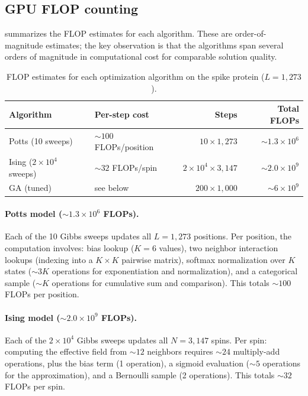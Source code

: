 \documentclass[11pt]{article}
\begin{document}
\subsection*{GPU FLOP counting}

 summarizes the FLOP estimates for each algorithm.
These are order-of-magnitude estimates; the key observation is that the algorithms span several orders of magnitude in computational cost for comparable solution quality.

\begin{table}[H]
\centering
\caption{FLOP estimates for each optimization algorithm on the spike protein ($L = 1{,}273$).}
\label{tab:flops}
\vspace{2mm}
\begin{tabular}{llrr}
\toprule
Algorithm & Per-step cost & Steps & Total FLOPs \\
\midrule
Potts (10 sweeps) & ${\sim}100$ FLOPs/position & $10 \times 1{,}273$ & ${\sim}1.3 \times 10^6$ \\
Ising ($2 \times 10^4$ sweeps) & ${\sim}32$ FLOPs/spin & $2 \times 10^4 \times 3{,}147$ & ${\sim}2.0 \times 10^9$ \\
GA (tuned) & see below & $200 \times 1{,}000$ & ${\sim}6 \times 10^9$ \\
\bottomrule
\end{tabular}
\end{table}

\paragraph{Potts model (${\sim}1.3 \times 10^6$ FLOPs).}
Each of the 10 Gibbs sweeps updates all $L = 1{,}273$ positions.
Per position, the computation involves: bias lookup ($K = 6$ values), two neighbor interaction lookups (indexing into a $K \times K$ pairwise matrix), softmax normalization over $K$ states (${\sim}3K$ operations for exponentiation and normalization), and a categorical sample (${\sim}K$ operations for cumulative sum and comparison).
This totals ${\sim}100$ FLOPs per position.

\paragraph{Ising model (${\sim}2.0 \times 10^9$ FLOPs).}
Each of the $2 \times 10^4$ Gibbs sweeps updates all $N = 3{,}147$ spins.
Per spin: computing the effective field from ${\sim}12$ neighbors requires ${\sim}24$ multiply-add operations, plus the bias term (1 operation), a sigmoid evaluation (${\sim}5$ operations for the approximation), and a Bernoulli sample (2 operations).
This totals ${\sim}32$ FLOPs per spin.
\end{document}
